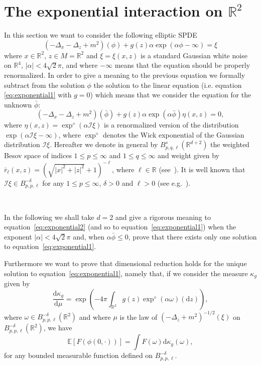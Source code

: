 \documentclass[a4paper,10pt]{article}
\newcommand{\mathd}{\mathrm{d}}
\begin{document}
\section{The exponential interaction on
$\mathbb{R}^2$}\label{section_exponential}

In this section we want to consider the following elliptic SPDE
\begin{equation}
  (- \Delta_x - \Delta_z + m^2) (\phi) + g (z) \alpha \exp (\alpha \phi -
  \infty) = \xi \label{eq:exponential1}
\end{equation}
where $x \in \mathbb{R}^2$, $z \in M =\mathbb{R}^2$ and $\xi = \xi (x, z)$ is
a standard Gaussian white noise on $\mathbb{R}^4$, $| \alpha | < 4 \sqrt{2}
\pi$, and where $- \infty$ means that the equation should be properly
renormalized. In order to give a meaning to the previous equation we formally
subtract from the solution $\phi$ the solution to the linear equation (i.e.
equation {\eqref{eq:exponential1}} with $g = 0$) which means that we consider
the equation for the unknown $\bar{\phi}$:
\begin{equation}
  (- \Delta_x - \Delta_z + m^2) (\bar{\phi}) + g (z) \alpha \exp (\alpha
  \bar{\phi}) \eta (x, z) = 0 \label{eq:exponential2},
\end{equation}
where $\eta (x, z) = \exp^{\diamond} (\alpha \mathcal{I} \xi)$ is a
renormalized version of the distribution $\exp (\alpha \mathcal{I} \xi -
\infty)$, where $\exp^{\diamond}$ denotes the Wick exponential of the Gaussian
distribution $\mathcal{I} \xi$. Hereafter we denote in general by $B^s_{p, q,
\ell} (\mathbb{R}^{d + 2})$ the weighted Besov space of indices $1 \leqslant p
\leqslant \infty$ and $1 \leqslant q \leqslant \infty$ and weight given by
$\bar{r}_{\ell} (x, z) = \left( \sqrt{| x |^2 + | z |^2} + 1 \right)^{-
\ell}$, where $\ell \in \mathbb{R}$ (see~{\cite{Triebel2006}}). It is well
known that $\mathcal{I} \xi \in B^{- \delta}_{p, p, \ell}$ for any $1
\leqslant p \leqslant \infty$, $\delta > 0$ and $\ell > 0$ (see
e.g.~{\cite{GH18}}).

\

In the following we shall take $d = 2$ and give a rigorous meaning to
equation~{\eqref{eq:exponential2}} (and so to
equation~{\eqref{eq:exponential1}}) when the exponent $| \alpha | < 4 \sqrt{2}
\pi$ and, when $\alpha \bar{\phi} \leqslant 0$, prove that there exists only
one solution to equation~{\eqref{eq:exponential1}}.

Furthermore we want to prove that dimensional reduction holds for the unique
solution to equation~{\eqref{eq:exponential1}}, namely that, if we consider
the measure $\kappa_g$ given by
\begin{equation}
  \frac{\mathd \kappa_g}{\mathd \mu} = \exp \left( - 4 \pi \int_{\mathbb{R}^2}
  g (z) \exp^{\diamond} (\alpha \omega) (\mathd z) \right)
  \label{eq:exponentiallaw1},
\end{equation}
where $\omega \in B^{- \delta}_{p, p, \ell} (\mathbb{R}^2)$ and where $\mu$ is
the law of $(- \Delta_z + m^2)^{- 1 / 2} (\xi)$ on $B^{- \delta}_{p, p, \ell}
(\mathbb{R}^2)$, we have
\[ \mathbb{E} [F (\phi (0, \cdot))] = \int F (\omega) \mathd \kappa_g (\omega)
   \label{eq:exponentialreduction1}, \]
for any bounded measurable function defined on $B^{- \delta}_{p, p, \ell}$.
\end{document}
